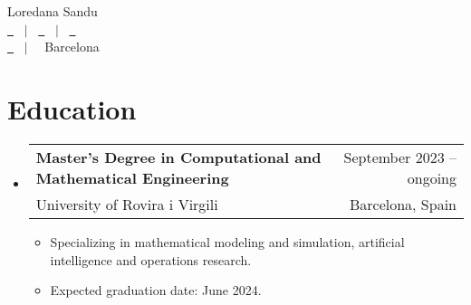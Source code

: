 \documentclass[a4paper,10pt]{article}
\makeatletter
\newcommand{\resumeQuadHeading}[4]{
  \item
  \begin{tabular*}{0.96\textwidth}[t]{l@{\extracolsep{\fill}}r}
    \textbf{#1} & \small #2 \\
    \small#3 & \small #4 \\
  \end{tabular*}
}
\newcommand{\resumeHeadingListStart}{
  \begin{itemize}[leftmargin=0.15in, label={}]
}
\newcommand{\resumeHeadingListEnd}{\end{itemize}}
\makeatother
\begin{document}
\begin{center}
    {\Huge Loredana Sandu } \\[1.2pc]
    \href{https://loredanasandu.github.io/}{\faLink \ } \, $|$ \, %
    \href{https://www.linkedin.com/in/loredana-sandu/}{\faLinkedinSquare \ } \, $|$ \, %
    \href{https://www.github.com/loredanasandu}{\faGithub \ } \\[0.1pc] %
    \href{mailto:loredana.sandu@estudiants.urv.cat}{\faEnvelope \ } \, $|$ \, %
    \faHome \ Barcelona \\[1.5pc] %
\end{center}





\section{Education}
  \resumeHeadingListStart{}
  \resumeQuadHeading{Master's Degree in Computational and Mathematical Engineering}{September 2023 – ongoing}
  {University of Rovira i Virgili}{Barcelona, Spain}
  \begin{itemize}[leftmargin=3em, itemsep=0.1em, topsep=2pt]
      \item \small Specializing in mathematical modeling and simulation, artificial intelligence and operations research.
      \item \small Expected graduation date: June 2024.
  \end{itemize}
  \resumeHeadingListEnd{}
\end{document}
